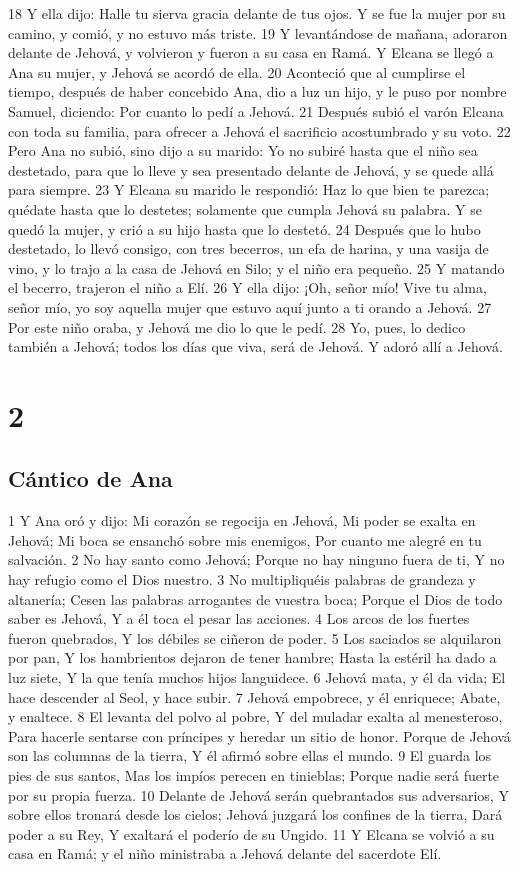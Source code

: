 18 Y ella dijo: Halle tu sierva gracia delante de tus ojos. Y se fue la mujer por su camino, y comió, y no estuvo más triste.
19 Y levantándose de mañana, adoraron delante de Jehová, y volvieron y fueron a su casa en Ramá. Y Elcana se llegó a Ana su mujer, y Jehová se acordó de ella.
20 Aconteció que al cumplirse el tiempo, después de haber concebido Ana, dio a luz un hijo, y le puso por nombre Samuel, diciendo: Por cuanto lo pedí a Jehová.
21 Después subió el varón Elcana con toda su familia, para ofrecer a Jehová el sacrificio acostumbrado y su voto.
22 Pero Ana no subió, sino dijo a su marido: Yo no subiré hasta que el niño sea destetado, para que lo lleve y sea presentado delante de Jehová, y se quede allá para siempre.
23 Y Elcana su marido le respondió: Haz lo que bien te parezca; quédate hasta que lo destetes; solamente que cumpla Jehová su palabra. Y se quedó la mujer, y crió a su hijo hasta que lo destetó.
24 Después que lo hubo destetado, lo llevó consigo, con tres becerros, un efa   de harina, y una vasija de vino, y lo trajo a la casa de Jehová en Silo; y el niño era pequeño.
25 Y matando el becerro, trajeron el niño a Elí.
26 Y ella dijo: ¡Oh, señor mío! Vive tu alma, señor mío, yo soy aquella mujer que estuvo aquí junto a ti orando a Jehová.
27 Por este niño oraba, y Jehová me dio lo que le pedí.
28 Yo, pues, lo dedico también a Jehová; todos los días que viva, será de Jehová. Y adoró allí a Jehová.

\chapter{2}

\section*{Cántico de Ana}


1 Y Ana oró y dijo:
Mi corazón se regocija en Jehová,
Mi poder se exalta en Jehová;
Mi boca se ensanchó sobre mis enemigos,
Por cuanto me alegré en tu salvación.
2 No hay santo como Jehová;
Porque no hay ninguno fuera de ti,
Y no hay refugio como el Dios nuestro.
3 No multipliquéis palabras de grandeza y altanería; 
Cesen las palabras arrogantes de vuestra boca;
Porque el Dios de todo saber es Jehová,
Y a él toca el pesar las acciones. 
4 Los arcos de los fuertes fueron quebrados,
Y los débiles se ciñeron de poder.
5 Los saciados se alquilaron por pan,
Y los hambrientos dejaron de tener hambre;
Hasta la estéril ha dado a luz siete,
Y la que tenía muchos hijos languidece.
6 Jehová mata, y él da vida;
El hace descender al Seol, y hace subir. 
7 Jehová empobrece, y él enriquece;
Abate, y enaltece.
8 El levanta del polvo al pobre,
Y del muladar exalta al menesteroso,
Para hacerle sentarse con príncipes y heredar un sitio de honor.
Porque de Jehová son las columnas de la tierra,
Y él afirmó sobre ellas el mundo.
9 El guarda los pies de sus santos,
Mas los impíos perecen en tinieblas;
Porque nadie será fuerte por su propia fuerza.
10 Delante de Jehová serán quebrantados sus adversarios,
Y sobre ellos tronará desde los cielos;
Jehová juzgará los confines de la tierra,
Dará poder a su Rey,
Y exaltará el poderío de su Ungido. 
11 Y Elcana se volvió a su casa en Ramá; y el niño ministraba a Jehová delante del sacerdote Elí.
